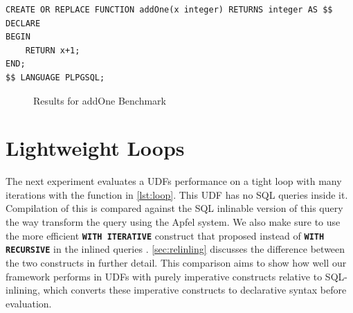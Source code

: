 \documentclass[12pt]{cmuthesis}
\newcommand{\dbSQL}[1]{\texttt{\textbf{#1}}\xspace}
\begin{document}
\begin{listing}
\begin{verbatim}
CREATE OR REPLACE FUNCTION addOne(x integer) RETURNS integer AS $$
DECLARE
BEGIN
    RETURN x+1;
END;
$$ LANGUAGE PLPGSQL;
\end{verbatim}
\caption{addOne Function}
\label{list:addOne}
\end{listing}

\begin{figure}
    \centering
    \caption{Results for addOne Benchmark}
    \label{fig:selectx}
  \end{figure}


  \section{Lightweight Loops}
  \label{sec:lightweight}

  The next experiment evaluates a UDFs performance on a tight loop with many iterations with the function in \cref{lst:loop}. This UDF has no SQL queries inside it. Compilation of this is compared against the SQL inlinable version of this query the way \citeauthor{duta19} transform the query using the Apfel system. We also make sure to use the more efficient \dbSQL{WITH ITERATIVE} construct that \citeauthor{duta19} proposed instead of \dbSQL{WITH RECURSIVE} in the inlined queries \cite{duta19}. \cref{sec:relinling} discusses the difference between the two constructs in further detail. This comparison aims to show how well our framework performs in UDFs with purely imperative constructs relative to SQL-inlining, which converts these imperative constructs to declarative syntax before evaluation.\\
\end{document}
